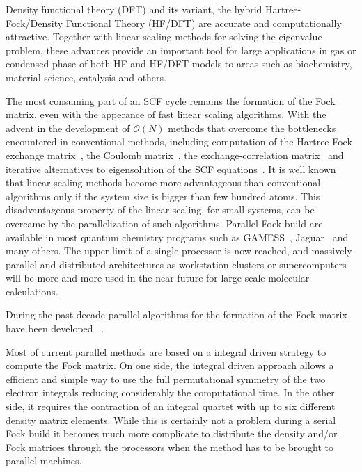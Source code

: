 \documentclass[prl,twocolumn,showpacs,twocolumngrid,superbib]{revtex4}
\begin{document}
 Density functional theory (DFT) and its variant, 
 the hybrid Hartree-Fock/Density Functional Theory (HF/DFT) are accurate and
 computationally attractive. Together with linear scaling methods 
 for solving the eigenvalue problem, these
 advances provide an important tool for large applications in gas or condensed phase 
 of both HF and HF/DFT models to areas such as biochemistry, material science, catalysis and others.


 The most consuming part of an SCF cycle remains the formation
 of the Fock matrix, even with the apperance of fast linear
 scaling algorithms. 
 With the advent in the development of $\mathcal{O}(N)$ methods
 that overcome the bottlenecks encountered in conventional methods,
 including computation of the Hartree-Fock exchange 
 matrix~\cite{ESchwegler96,ESchwegler97,ESchwegler98A,ESchwegler99,ESchwegler00,CTymczak04b},
 the Coulomb 
 matrix~\cite{CWhite94B,CWhite96A,MChallacombe96,MChallacombe96B,MStrain96,
              JPerezjorda97,MChallacombe97,CTymczak04a}, 
 the exchange-correlation 
 matrix~\cite{CTymczak04a,Jorda95,RStratmann96,CGuerra98,MChallacombe00A}
 and iterative alternatives to eigensolution of the SCF 
 equations~\cite{XLi93,MDaw93,ADaniels97,APalser98,
                 MChallacombe99,ANiklasson02A,ANiklasson03}.
 It is well known that linear scaling 
 methods become more advantageous than conventional  
 algorithms only if the system size is bigger than
 few hundred atoms. This disadvantageous property of the linear
 scaling, for small systems, can be overcame by the
 parallelization of such algorithms. 
 Parallel Fock build are available in most quantum
 chemistry programs such as GAMESS~\cite{GAMESS},
 Jaguar~\cite{DChasman98} and many others. 
 The upper limit of a single processor
 is now reached, and massively parallel and distributed
 architectures as workstation clusters or supercomputers will be 
 more and more used in the near future for large-scale 
 molecular calculations.


 During the past decade parallel algorithms for the 
 formation of the Fock matrix have been developed
 ~\cite{MColvin93,TFurlani95,RHarrison96,YAlexeev02,HTakashima02,RLindh03}.


 Most of current parallel methods are based on a integral driven strategy
 to compute the Fock matrix. On one side, the integral driven approach
 allows a efficient and simple way to use the full permutational symmetry
 of the two electron integrals reducing considerably the computational time. 
 In the other side, it requires the contraction of an integral quartet with up to six 
 different density matrix elements.
 While this is certainly not a problem during a serial Fock build it becomes
 much more complicate to distribute the density and/or Fock matrices through the 
 processors when the method has to be brought to parallel machines.
\end{document}

